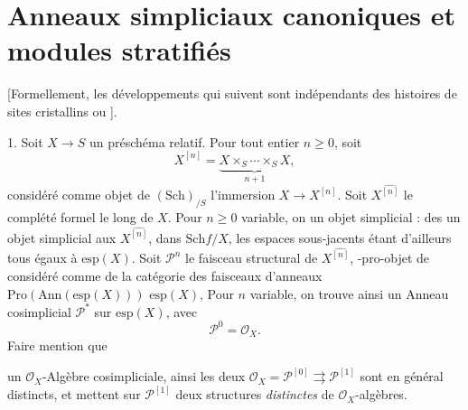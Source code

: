\documentclass[11pt,a4paper]{article}
\begin{document}


\section*{Anneaux \struck{\ill{}} simpliciaux canoniques et modules stratifiés}

\struck{\ill{}} [Formellement, les développements qui suivent sont
indépendants des \struck{\ill{}} histoires de sites cristallins ou
].

1. Soit $X \to S$ un préschéma relatif. Pour tout entier $n \geq 0$, soit
\[
  X^{[n]} = \underbrace{X \times_S \cdots \times_S X}_{n+1},
\]
considéré comme objet \struck{\ill{}} de $(\mathrm{Sch})_{/S}$ \ill{} \ill{}
 l'immersion  $X \to X^{[n]}$. Soit $X^{\widehat{[n]}}$ le complété formel \ill{} le long de $X$.
Pour $n \geq 0$ variable, on \ill{} un objet simplicial : \ill{} des
\ill{} un objet simplicial \ill{} aux $X^{\widehat{[n]}}$, \ill{} dans
$\mathrm{Sch}f/X$, les espaces sous-jacents étant d'ailleurs tous égaux à
$\mathrm{esp}(X)$. Soit $\mathcal{P}^n$ \struck{\ill{}} le faisceau
structural de $X^{\widehat{[n]}}$, -pro-objet de \struck{\ill{}}
\struck{\ill{}} considéré comme \ill{} de la catégorie des faisceaux d'anneaux
$\mathrm{Pro}(\mathrm{Ann}(\mathrm{esp}(X)))$ \ill{} $\mathrm{esp}(X)$,
\ill{} Pour $n$ variable, on trouve ainsi un Anneau cosimplicial
$\mathcal{P}^{*}$ sur $\mathrm{esp}(X)$, avec
\[
  \mathcal{P}^{0} = \mathcal{O}_X .
\]
Faire mention que \emph{}


\ill{} un $\mathcal{O}_X$-Algèbre cosimpliciale, ainsi les deux \ill{}
$\mathcal{O}_X = \mathcal{P}^{[0]} \rightrightarrows \mathcal{P}^{[1]}$ sont en
général distincts, et mettent sur $\mathcal{P}^{[1]}$ deux structures
\emph{distinctes} de $\mathcal{O}_X$-algèbres.
\end{document}
